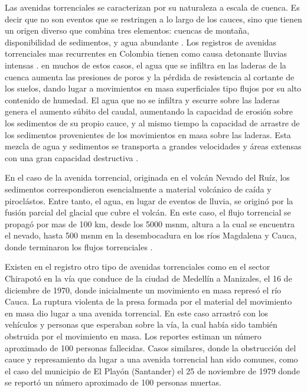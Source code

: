 \documentclass{article}
\begin{document}
Las avenidas torrenciales se caracterizan por su naturaleza a escala de cuenca. Es decir que no son eventos que se restringen a lo largo de los cauces, sino que tienen un origen diverso que combina tres elementos: cuencas de montaña, disponibilidad de sedimentos, y agua abundante \cite{arango2021morphometrical, aristizabal2020definicion}. Los registros de avenidas torrenciales mas recurrentes en Colombia tienen como causa detonante lluvias intensas \cite{aristizabal2020spatial}. en muchos de estos casos, el agua que se infiltra en las laderas de la cuenca aumenta las presiones de poros y la pérdida de resistencia al cortante de los suelos, dando lugar a movimientos en masa superficiales tipo flujos por su alto contenido de humedad. El agua que no se infiltra y escurre sobre las laderas genera el aumento súbito del caudal, aumentando la capacidad de erosión sobre los sedimentos de su propio cauce, y al mismo tiempo la capacidad de arrastre de los sedimentos provenientes de los movimientos en masa sobre las laderas. Esta mezcla de agua y sedimentos se transporta a grandes velocidades y áreas extensas con una gran capacidad destructiva \cite{aristizabal2020definicion}.

En el caso de la avenida torrencial, originada en el volcán Nevado del Ruíz, los sedimentos correspondieron esencialmente a material volcánico de caída y piroclástos. Entre tanto, el agua, en lugar de eventos de lluvia, se originó por la fusión parcial del glacial que cubre el volcán. En este caso, el flujo torrencial se propagó por mas de 100 km, desde los 5000 msnm, altura a la cual se encuentra el nevado, hasta 500 msnm en la desembocadura en los ríos Magdalena y Cauca, donde terminaron los flujos torrenciales \cite{hermelin2005desastres}.

Existen en el registro otro tipo de avenidas torrenciales como en el sector Chirapotó en la vía que conduce de la ciudad de Medellín a Manizales, el 16 de diciembre de 1970, donde inicialmente un movimiento en masa represó el río Cauca. La ruptura violenta de la presa formada por el material del movimiento en masa dio lugar a una avenida torrencial. En este caso arrastró con los vehículos y personas que esperaban sobre la vía, la cual había sido también obstruida por el movimiento en masa. Los reportes estiman un número aproximado de 100 personas fallecidas. Casos similares, donde la obstrucción del cauce y represamiento da lugar a una avenida torrencial han sido comunes, como el caso del municipio de El Playón (Santander) el 25 de noviembre de 1979 donde se reportó un número aproximado de 100 personas muertas.
\end{document}
